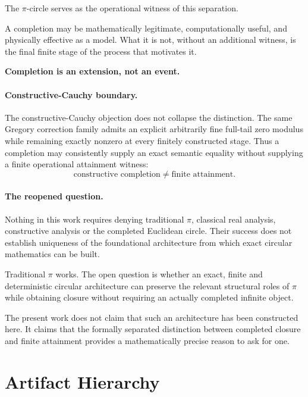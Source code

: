 \documentclass[11pt,a4paper]{article}
\begin{document}
The $\pi$-circle serves as the operational witness of this separation.

A completion may be mathematically legitimate, computationally useful,
and physically effective as a model. What it is not, without an
additional witness, is the final finite stage of the process that
motivates it.

\begin{center}
\textbf{Completion is an extension, not an event.}
\end{center}




\paragraph{Constructive-Cauchy boundary.}
The constructive-Cauchy objection does not collapse the distinction.
The same Gregory correction family admits an explicit arbitrarily fine
full-tail zero modulus while remaining exactly nonzero at every
finitely constructed stage.  Thus a completion may consistently supply
an exact semantic equality without supplying a finite operational
attainment witness:
\[
\boxed{
\text{constructive completion}
\neq
\text{finite attainment}.
}
\]



\paragraph{The reopened question.}
Nothing in this work requires denying traditional \(\pi\), classical
real analysis, constructive analysis or the completed Euclidean
circle. Their success does not establish uniqueness of the
foundational architecture from which exact circular mathematics can
be built.

Traditional \(\pi\) works. The open question is whether an exact,
finite and deterministic circular architecture can preserve the
relevant structural roles of \(\pi\) while obtaining closure without
requiring an actually completed infinite object.

The present work does not claim that such an architecture has been
constructed here. It claims that the formally separated distinction
between completed closure and finite attainment provides a
mathematically precise reason to ask for one.

\section*{Artifact Hierarchy}
\end{document}

